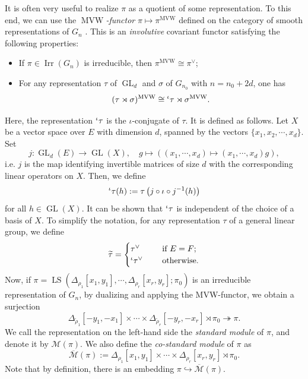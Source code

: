 \documentclass[11pt,letterpaper]{amsart}
\theoremstyle{plain}
\numberwithin{theorem}{section}
\numberwithin{equation}{subsection}
\theoremstyle{remark}
\newcommand{\GL}{\operatorname{GL}}
\newcommand{\Irr}{\operatorname{Irr}}
\newcommand{\LS}{\operatorname{LS}} %
\newcommand{\MVW}{\operatorname{MVW}} %
\def\calM{\mathcal{M}}
\begin{document}
It is often very useful to realize \(\pi\) as a quotient of some representation. To this end, we can use the \emph{\(\MVW\)-functor} \(\pi\mapsto\pi^{\MVW}\) defined on the category of smooth representations of \(G_n\) \cite{MR1041060}. This is an \emph{involutive} covariant functor satisfying the following properties:
\begin{itemize}
    \item If \(\pi\in\Irr(G_n)\) is irreducible, then \(\pi^{\MVW}\cong\pi^{\vee}\);

    \vskip 5pt

    \item For any representation \(\tau\) of \(\GL_d\) and \(\sigma\) of \(G_{n_0}\) with \(n=n_0+2d\), one has
    \[
        (\tau\rtimes\sigma)^{\MVW}\cong \prescript{\iota}{}\tau\rtimes\sigma^{\MVW}.
    \]
\end{itemize}
\vskip 5pt
Here, the representation \(\prescript{\iota}{}\tau\) is the \(\iota\)-conjugate of \(\tau\). It is defined as follows. Let \(X\) be a vector space over \(E\) with dimension \(d\), spanned by the vectors \(\{x_1,x_2,\cdots,x_d\}.\) Set
\[
    j:\GL_d(E)\to \GL(X),\quad g\mapsto \left((x_1,\cdots,x_d)\mapsto (x_1,\cdots,x_d)g\right),
\]
i.e. \(j\) is the map identifying invertible matrices of size \(d\) with the corresponding linear operators on \(X\). Then, we define
\[
    \prescript{\iota}{}\tau(h):=\tau\left(j\circ \iota\circ j^{-1}(h)\right)
\]
for all \(h\in\GL(X)\). It can be shown that \(\prescript{\iota}{}\tau\) is independent of the choice of a basis of \(X\). To simplify the notation, for any representation $\tau$ of a general linear group, we define
\begin{equation}\label{E:TildeRepDef}
    \widetilde{\tau} =\begin{cases}
\tau^\vee \quad&\text{ if }E=F;\\
\prescript{\iota}{}\tau^\vee \quad&\text{ otherwise.}
\end{cases}
\end{equation}
Now, if $\pi= \LS\left(\Delta_{\rho_1}[x_1,y_1],\cdots,\Delta_{\rho_r}[x_r,y_r];\pi_0\right)$ is an irreducible representation of $G_n$, by dualizing and applying the MVW-functor, we obtain a surjection
\[
    \Delta_{\widetilde{\rho}_1}[-y_1,-x_1]\times\cdots\times\Delta_{\widetilde{\rho}_r}[-y_r,-x_r]\rtimes\pi_0\twoheadrightarrow\pi.
\]
We call the representation on the left-hand side the \emph{standard module} of \(\pi\), and denote it by \(\calM(\pi)\). We also define the \emph{co-standard module} of \(\pi\) as
\[
    \overline{\calM}(\pi):=\Delta_{\rho_1}[x_1,y_1]\times\cdots\times\Delta_{\rho_r}[x_r,y_r]\rtimes\pi_0.
\]
Note that by definition, there is an embedding \(\pi\hookrightarrow\overline{\calM}(\pi)\).
\end{document}
